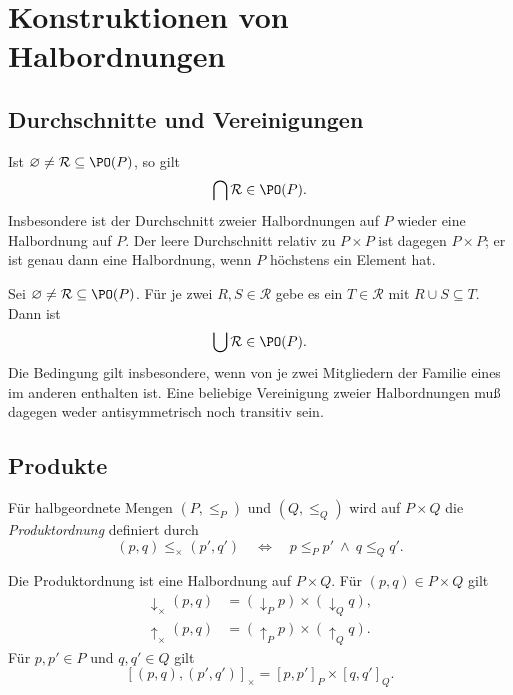 \chapter{Konstruktionen von Halbordnungen}
\label{b12guide:ch:constructions}

\section{Durchschnitte und Vereinigungen}

\begin{theorem}
\label{b12guide:thm:intersections}
Ist $\varnothing\ne\mathcal R\subseteq\PO(P)$, so gilt
\[
 \bigcap\mathcal R\in\PO(P).
\]
Insbesondere ist der Durchschnitt zweier Halbordnungen auf
$P$ wieder eine Halbordnung auf $P$.
Der leere Durchschnitt relativ zu $P\times P$ ist dagegen
$P\times P$; er ist genau dann eine Halbordnung, wenn $P$
höchstens ein Element hat.
\end{theorem}

\begin{theorem}
\label{b12guide:thm:directed-union}
Sei $\varnothing\ne\mathcal R\subseteq\PO(P)$.
Für je zwei $R,S\in\mathcal R$ gebe es ein $T\in\mathcal R$
mit $R\cup S\subseteq T$. Dann ist
\[
 \bigcup\mathcal R\in\PO(P).
\]
Die Bedingung gilt insbesondere, wenn von je zwei Mitgliedern
der Familie eines im anderen enthalten ist.
Eine beliebige Vereinigung zweier Halbordnungen muß dagegen
weder antisymmetrisch noch transitiv sein.
\end{theorem}

\section{Produkte}

\begin{definition}[Produktordnung]\label{b12guide:def:product}
Für halbgeordnete Mengen $(P,\leq_P)$ und $(Q,\leq_Q)$ wird
auf $P\times Q$ die \emph{Produktordnung} definiert durch
\[
 (p,q)\leq_{\times}(p',q')
 \quad\Longleftrightarrow\quad p\leq_P p'\ \land\ q\leq_Q q'.
\]
\end{definition}

\begin{theorem}
\label{b12guide:thm:product}
Die Produktordnung ist eine Halbordnung auf $P\times Q$.
Für $(p,q)\in P\times Q$ gilt
\[
\begin{aligned}
 \downarrow_{\times}(p,q)&=(\downarrow_P p)\times(\downarrow_Q q),\\
 \uparrow_{\times}(p,q)&=(\uparrow_P p)\times(\uparrow_Q q).
\end{aligned}
\]
Für $p,p'\in P$ und $q,q'\in Q$ gilt
\[
 [(p,q),(p',q')]_{\times}=[p,p']_P\times[q,q']_Q.
\]
\end{theorem}


